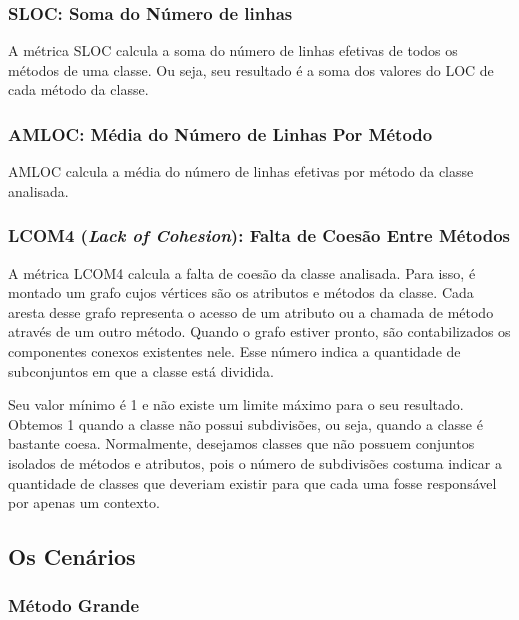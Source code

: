 \subsubsection{SLOC: Soma do Número de linhas}
                                          
A métrica SLOC calcula a soma do número de linhas efetivas de todos os métodos de uma classe. Ou seja, seu resultado é a soma dos valores do LOC de cada método da classe.


\subsubsection{AMLOC: Média do Número de Linhas Por Método}
                                   
AMLOC calcula a média do número de linhas efetivas por método da classe analisada.
	

\subsubsection{LCOM4 (\textit{Lack of Cohesion}): Falta de Coesão Entre Métodos}

A métrica LCOM4 \citep{HM96} calcula a falta de coesão da classe analisada. Para isso, é montado um grafo cujos vértices são os atributos e métodos da classe. Cada aresta desse grafo representa o acesso de um atributo ou a chamada de método através de um outro método. Quando o grafo estiver pronto, são contabilizados os componentes conexos existentes nele. Esse número indica a quantidade de subconjuntos em que a classe está dividida.

Seu valor mínimo é 1 e não existe um limite máximo para o seu resultado. Obtemos 1 quando a classe não possui subdivisões, ou seja, quando a classe é bastante coesa. Normalmente, desejamos classes que não possuem conjuntos isolados de métodos e atributos, pois o número de subdivisões costuma indicar a quantidade de classes que deveriam existir para que cada uma fosse responsável por apenas um contexto.
                                                    
	  

\subsection{Os Cenários}

\subsubsection{Método Grande}

